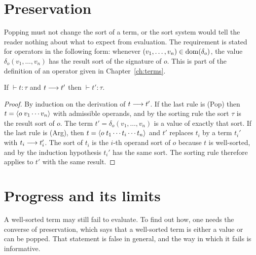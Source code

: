 \section{Preservation}

Popping must not change the sort of a term, or the sort system would tell the reader nothing about what to expect from evaluation. The requirement is stated for operators in the following form: whenever $(v_1,\dots,v_n)\in\operatorname{dom}(\delta_o)$, the value $\delta_o(v_1,\dots,v_n)$ has the result sort of the signature of $o$. This is part of the definition of an operator given in Chapter~\ref{ch:terms}.

\begin{theorem}[Preservation]\label{thm:preservation}
If $\vdash t:\tau$ and $t\longrightarrow t'$ then $\vdash t':\tau$.
\end{theorem}
\begin{proof}
By induction on the derivation of $t\longrightarrow t'$. If the last rule is (Pop) then $t=\langle o\; v_1\cdots v_n\rangle$ with admissible operands, and by the sorting rule the sort $\tau$ is the result sort of $o$. The term $t'=\delta_o(v_1,\dots,v_n)$ is a value of exactly that sort. If the last rule is (Arg), then $t=\langle o\; t_1\cdots t_i\cdots t_n\rangle$ and $t'$ replaces $t_i$ by a term $t_i'$ with $t_i\longrightarrow t_i'$. The sort of $t_i$ is the $i$-th operand sort of $o$ because $t$ is well-sorted, and by the induction hypothesis $t_i'$ has the same sort. The sorting rule therefore applies to $t'$ with the same result.
\end{proof}

\section{Progress and its limits}

A well-sorted term may still fail to evaluate. To find out how, one needs the converse of preservation, which says that a well-sorted term is either a value or can be popped. That statement is false in general, and the way in which it fails is informative.

